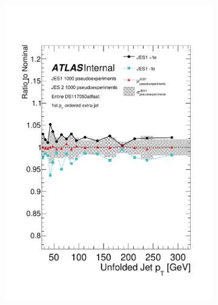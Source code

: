 \begin{figure}
\begin{subfigure}[]{0.45\textwidth}
\includegraphics[width=\textwidth]{fig/UnfoldSys/Toy/JES1VarBandRatioJet0.pdf}
\end{subfigure}
\begin{subfigure}[]{0.45\textwidth}

\end{subfigure}
\end{figure}
